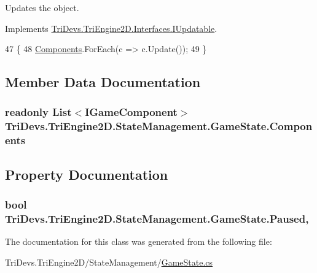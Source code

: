 Updates the object. 



Implements \hyperlink{interface_tri_devs_1_1_tri_engine2_d_1_1_interfaces_1_1_i_updatable_a01e54ce26f078bffd4434aca86e2a7e4}{Tri\-Devs.\-Tri\-Engine2\-D.\-Interfaces.\-I\-Updatable}.


\begin{DoxyCode}
47         \{
48             \hyperlink{class_tri_devs_1_1_tri_engine2_d_1_1_state_management_1_1_game_state_ab1ea74d5e4192c58474a485bf162fd67}{Components}.ForEach(c => c.Update());
49         \}
\end{DoxyCode}


\subsection{Member Data Documentation}
\hypertarget{class_tri_devs_1_1_tri_engine2_d_1_1_state_management_1_1_game_state_ab1ea74d5e4192c58474a485bf162fd67}{
\subsubsection[{Components}]{\setlength{\rightskip}{0pt plus 5cm}readonly List$<${\bf I\-Game\-Component}$>$ Tri\-Devs.\-Tri\-Engine2\-D.\-State\-Management.\-Game\-State.\-Components\hspace{0.3cm}{\ttfamily [protected]}}}\label{class_tri_devs_1_1_tri_engine2_d_1_1_state_management_1_1_game_state_ab1ea74d5e4192c58474a485bf162fd67}


\subsection{Property Documentation}
\hypertarget{class_tri_devs_1_1_tri_engine2_d_1_1_state_management_1_1_game_state_aa90383289e518b7c606a479c48b28510}{
\subsubsection[{Paused}]{\setlength{\rightskip}{0pt plus 5cm}bool Tri\-Devs.\-Tri\-Engine2\-D.\-State\-Management.\-Game\-State.\-Paused\hspace{0.3cm}{\ttfamily [get]}, {\ttfamily [set]}}}\label{class_tri_devs_1_1_tri_engine2_d_1_1_state_management_1_1_game_state_aa90383289e518b7c606a479c48b28510}


The documentation for this class was generated from the following file\-:\begin{DoxyCompactItemize}
\item 
Tri\-Devs.\-Tri\-Engine2\-D/\-State\-Management/\hyperlink{_game_state_8cs}{Game\-State.\-cs}\end{DoxyCompactItemize}
